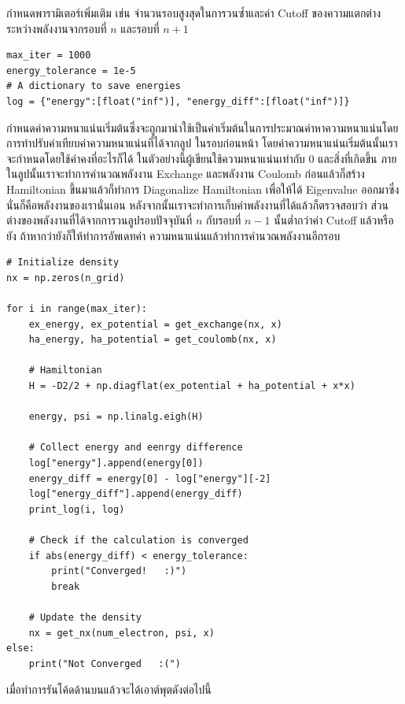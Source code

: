 กำหนดพารามิเตอร์เพิ่มเติม เช่น จำนวนรอบสูงสุดในการวนซ้ำและค่า Cutoff ของความแตกต่างระหว่างพลังงานจากรอบที่ $n$ และรอบที่ $n+1$

\begin{lstlisting}[style=MyPython]
max_iter = 1000
energy_tolerance = 1e-5
# A dictionary to save energies
log = {"energy":[float("inf")], "energy_diff":[float("inf")]}
\end{lstlisting}

\vspace{1em}

กำหนดค่าความหนาแน่นเริ่มต้นซึ่งจะถูกมานำใช้เป็นค่าเริ่มต้นในการประมาณค่าหาความหนาแน่นโดยการทำปรับค่าเทียบค่าความหนาแน่นที่ได้จากลูป%
ในรอบก่อนหน้า โดยค่าความหนาแน่นเริ่มต้นนั้นเราจะกำหนดโดยใช้ค่าคงที่อะไรก็ได้ ในตัวอย่างนี้ผู้เขียนใช้ความหนาแน่นเท่ากับ 0 และสิ่งที่เกิดขึ้น%
ภายในลูปนั้นเราจะทำการคำนวณพลังงาน Exchange และพลังงาน Coulomb ก่อนแล้วก็สร้าง Hamiltonian ขึ้นมาแล้วก็ทำการ Diagonalize
Hamiltonian เพื่อให้ได้ Eigenvalue ออกมาซึ่งนั่นก็คือพลังงานของเรานั่นเอน หลังจากนั้นเราจะทำการเก็บค่าพลังงานที่ได้แล้วก็ตรวจสอบว่า%
ส่วนต่างของพลังงานที่ได้จากการวนลูปรอบปัจจุบันที่ $n$ กับรอบที่ $n-1$ นั้นต่ำกว่าค่า Cutoff แล้วหรือยัง ถ้าหากว่ายังก็ให้ทำการอัพเดทค่า%
ความหนาแน่นแล้วทำการคำนวณพลังงานอีกรอบ

\begin{lstlisting}[style=MyPython]
# Initialize density
nx = np.zeros(n_grid)

for i in range(max_iter):
    ex_energy, ex_potential = get_exchange(nx, x)
    ha_energy, ha_potential = get_coulomb(nx, x)
    
    # Hamiltonian
    H = -D2/2 + np.diagflat(ex_potential + ha_potential + x*x)
    
    energy, psi = np.linalg.eigh(H)
    
    # Collect energy and eenrgy difference
    log["energy"].append(energy[0])
    energy_diff = energy[0] - log["energy"][-2]
    log["energy_diff"].append(energy_diff)
    print_log(i, log)
    
    # Check if the calculation is converged
    if abs(energy_diff) < energy_tolerance:
        print("Converged!   :)")
        break
    
    # Update the density
    nx = get_nx(num_electron, psi, x)
else:
    print("Not Converged   :(")
\end{lstlisting}

\vspace{1em}

\noindent เมื่อทำการรันโค้ดด้านบนแล้วจะได้เอาต์พุตดังต่อไปนี้

